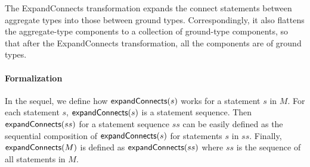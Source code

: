 
The ExpandConnects transformation expands the connect statements between aggregate
types into those between ground types. Correspondingly, it also flattens the aggregate-type components to a collection of ground-type components, so that after the ExpandConnects transformation, all the components are of ground types. 


\paragraph*{Formalization}
In the sequel, we define how ${\sf expandConnects}(s)$ works for a statement $s$ in $M$. 
For each statement $s$, ${\sf expandConnects}(s)$ is a statement sequence. 
Then ${\sf expandConnects}(ss)$ for a statement sequence $ss$ can be easily defined as the sequential composition of ${\sf expandConnects}(s)$ for statements $s$ in $ss$. Finally, ${\sf expandConnects}(M)$ is defined as ${\sf expandConnects}(ss)$ where $ss$ is the sequence of all statements in $M$. 

